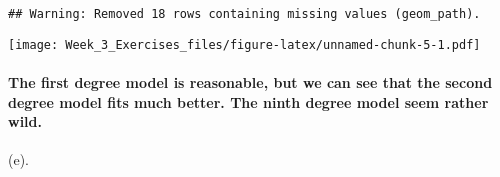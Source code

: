 \documentclass[]{article}
\let\oldparagraph\paragraph
\renewcommand{\paragraph}[1]{\oldparagraph{#1}\mbox{}}
\begin{document}
\begin{verbatim}
## Warning: Removed 18 rows containing missing values (geom_path).
\end{verbatim}

\texttt{[image: Week\_3\_Exercises\_files/figure-latex/unnamed-chunk-5-1.pdf]}

\hypertarget{the-first-degree-model-is-reasonable-but-we-can-see-that-the-second-degree-model-fits-much-better.-the-ninth-degree-model-seem-rather-wild.}{%
\paragraph{The first degree model is reasonable, but we can see that the
second degree model fits much better. The ninth degree model seem rather
wild.}\label{the-first-degree-model-is-reasonable-but-we-can-see-that-the-second-degree-model-fits-much-better.-the-ninth-degree-model-seem-rather-wild.}}

(e).
\end{document}
